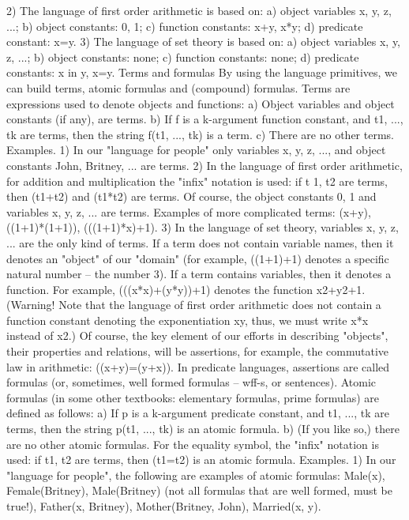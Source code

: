 2) The language of first order arithmetic is based on: a) object variables x, y, z, ...; b) object constants: 0, 1; c) function
constants: x+y, x*y; d) predicate constant: x=y.
3) The language of set theory is based on: a) object variables x, y, z, ...; b) object constants: none; c) function constants: none;
d) predicate constants: x in y, x=y.
Terms and formulas
By using the language primitives, we can build terms, atomic formulas and (compound) formulas.
Terms are expressions used to denote objects and functions:
a) Object variables and object constants (if any), are terms.
b) If f is a k-argument function constant, and t1, ..., tk are terms, then the string f(t1, ..., tk) is a term.
c) There are no other terms.
Examples. 1) In our "language for people" only variables x, y, z, ..., and object constants John, Britney, ... are terms.
2) In the language of first order arithmetic, for addition and multiplication the "infix" notation is used: if t 1, t2 are terms, then
(t1+t2) and (t1*t2) are terms. Of course, the object constants 0, 1 and variables x, y, z, ... are terms. Examples of more
complicated terms: (x+y), ((1+1)*(1+1)), (((1+1)*x)+1).
3) In the language of set theory, variables x, y, z, ... are the only kind of terms.
If a term does not contain variable names, then it denotes an "object" of our "domain" (for example,
((1+1)+1) denotes a specific natural number – the number 3). If a term contains variables, then it denotes
a function. For example, (((x*x)+(y*y))+1) denotes the function x2+y2+1. (Warning! Note that the
language of first order arithmetic does not contain a function constant denoting the exponentiation xy,
thus, we must write x*x instead of x2.)
Of course, the key element of our efforts in describing "objects", their properties and relations, will be
assertions, for example, the commutative law in arithmetic: ((x+y)=(y+x)). In predicate languages,
assertions are called formulas (or, sometimes, well formed formulas – wff-s, or sentences).
Atomic formulas (in some other textbooks: elementary formulas, prime formulas) are defined as follows:
a) If p is a k-argument predicate constant, and t1, ..., tk are terms, then the string p(t1, ..., tk) is an atomic
formula.
b) (If you like so,) there are no other atomic formulas.
For the equality symbol, the "infix" notation is used: if t1, t2 are terms, then (t1=t2) is an atomic formula.
Examples. 1) In our "language for people", the following are examples of atomic formulas: Male(x), Female(Britney),
Male(Britney) (not all formulas that are well formed, must be true!), Father(x, Britney), Mother(Britney, John), Married(x, y).
